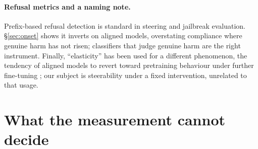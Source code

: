 \documentclass{article}
\begin{document}
\paragraph{Refusal metrics and a naming note.} Prefix-based refusal detection is standard in
steering and jailbreak evaluation. \S\ref{sec:onset} shows it inverts on aligned models,
overstating compliance where genuine harm has not risen; classifiers that judge genuine harm
\citep{harmbench} are the right instrument. Finally, ``elasticity'' has been used for a different
phenomenon, the tendency of aligned models to revert toward pretraining behaviour under further
fine-tuning \citep{jielasticity}; our subject is steerability under a fixed intervention, unrelated
to that usage.

\section{What the measurement cannot decide}\label{sec:limits}
\end{document}
